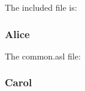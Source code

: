 \documentclass{article}
\begin{document}


The included file is:


\subsubsection*{Alice}


The common.asl file:



\subsubsection*{Carol}




\end{document}
